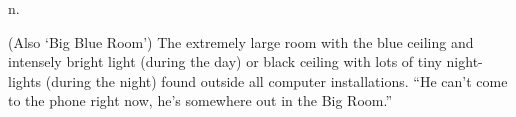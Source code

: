  n.

(Also `Big Blue Room') The extremely large room with the blue ceiling
and intensely bright light (during the day) or black ceiling with lots
of tiny night-lights (during the night) found outside all computer
installations. ``He can't come to the phone right now, he's somewhere
out in the Big Room.''

